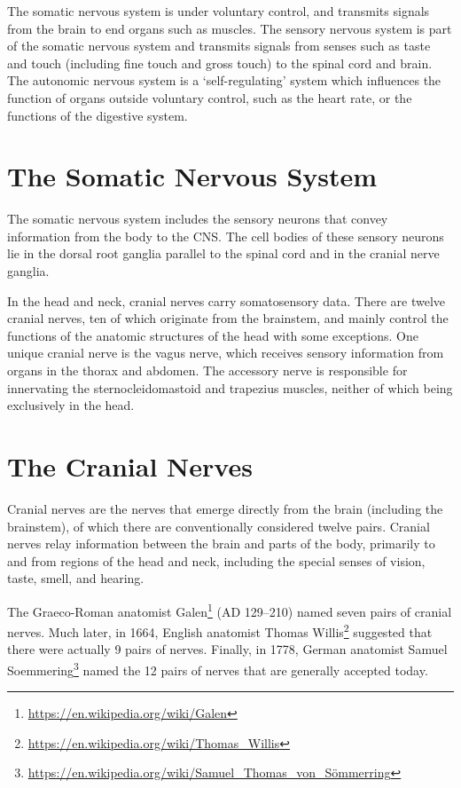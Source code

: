 \documentclass[]{book}
\let\rmarkdownfootnote\footnote%
\def\footnote{\protect\rmarkdownfootnote}
\renewcommand{\href}[2]{#2\footnote{\url{#1}}}
\begin{document}
The somatic nervous system is under voluntary control, and transmits signals from the brain to end organs such as muscles. The sensory nervous system is part of the somatic nervous system and transmits signals from senses such as taste and touch (including fine touch and gross touch) to the spinal cord and brain. The autonomic nervous system is a `self-regulating' system which influences the function of organs outside voluntary control, such as the heart rate, or the functions of the digestive system.

\hypertarget{the-somatic-nervous-system}{%
\section{The Somatic Nervous System}\label{the-somatic-nervous-system}}

The somatic nervous system includes the sensory neurons that convey information from the body to the CNS. The cell bodies of these sensory neurons lie in the dorsal root ganglia parallel to the spinal cord and in the cranial nerve ganglia.

In the head and neck, cranial nerves carry somatosensory data. There are twelve cranial nerves, ten of which originate from the brainstem, and mainly control the functions of the anatomic structures of the head with some exceptions. One unique cranial nerve is the vagus nerve, which receives sensory information from organs in the thorax and abdomen. The accessory nerve is responsible for innervating the sternocleidomastoid and trapezius muscles, neither of which being exclusively in the head.

\hypertarget{the-cranial-nerves}{%
\section{The Cranial Nerves}\label{the-cranial-nerves}}

Cranial nerves are the nerves that emerge directly from the brain (including the brainstem), of which there are conventionally considered twelve pairs. Cranial nerves relay information between the brain and parts of the body, primarily to and from regions of the head and neck, including the special senses of vision, taste, smell, and hearing.

The Graeco-Roman anatomist \href{https://en.wikipedia.org/wiki/Galen}{Galen} (AD 129--210) named seven pairs of cranial nerves. Much later, in 1664, English anatomist \href{https://en.wikipedia.org/wiki/Thomas_Willis}{Thomas Willis} suggested that there were actually 9 pairs of nerves. Finally, in 1778, German anatomist \href{https://en.wikipedia.org/wiki/Samuel_Thomas_von_Sömmerring}{Samuel Soemmering} named the 12 pairs of nerves that are generally accepted today.
\end{document}

